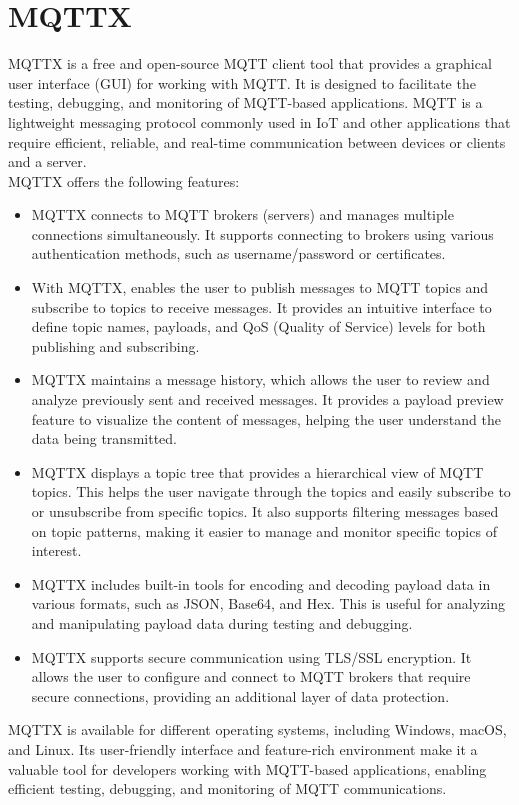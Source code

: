 \section{MQTTX}
MQTTX is a free and open-source \ac{MQTT} client tool that provides a graphical user interface (GUI) for working with \ac{MQTT}. It is designed to facilitate the testing, debugging, and monitoring of \ac{MQTT}-based applications. \ac{MQTT} is a lightweight messaging protocol commonly used in \ac{IoT} and other applications that require efficient, reliable, and real-time communication between devices or clients and a server.\vspace{5mm} \\
MQTTX offers the following features:
\begin{itemize}
  \item MQTTX connects to \ac{MQTT} brokers (servers) and manages multiple connections simultaneously. It supports connecting to brokers using various authentication methods, such as username/password or certificates.
  \item With MQTTX, enables the user to publish messages to \ac{MQTT} topics and subscribe to topics to receive messages. It provides an intuitive interface to define topic names, payloads, and QoS (Quality of Service) levels for both publishing and subscribing.
  \item MQTTX maintains a message history, which allows the user to review and analyze previously sent and received messages. It provides a payload preview feature to visualize the content of messages, helping the user understand the data being transmitted.
  \item MQTTX displays a topic tree that provides a hierarchical view of MQTT topics. This helps the user navigate through the topics and easily subscribe to or unsubscribe from specific topics. It also supports filtering messages based on topic patterns, making it easier to manage and monitor specific topics of interest.
  \item MQTTX includes built-in tools for encoding and decoding payload data in various formats, such as JSON, Base64, and Hex. This is useful for analyzing and manipulating payload data during testing and debugging.
  \item  MQTTX supports secure communication using TLS/SSL encryption. It allows the user to configure and connect to MQTT brokers that require secure connections, providing an additional layer of data protection.
\end{itemize}
MQTTX is available for different operating systems, including Windows, macOS, and Linux. Its user-friendly interface and feature-rich environment make it a valuable tool for developers working with MQTT-based applications, enabling efficient testing, debugging, and monitoring of MQTT communications.
